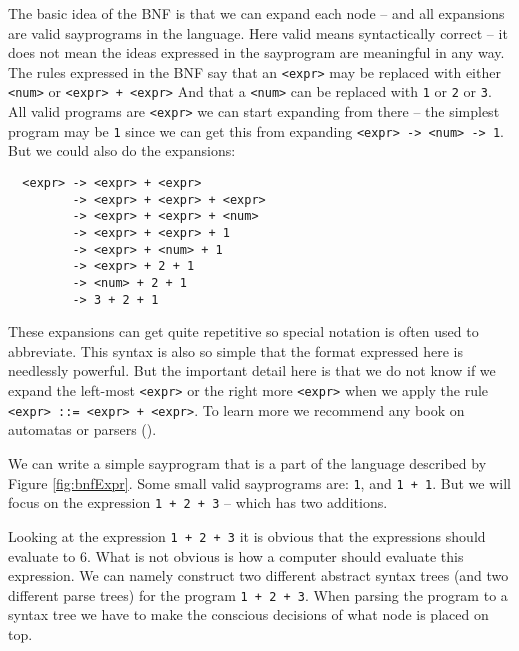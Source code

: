 The basic idea of the BNF is that we can expand each node -- and all expansions are valid say{programs} in the language. Here valid means syntactically correct -- it does not mean the ideas expressed in the say{program} are meaningful in any way. The rules expressed in the BNF say that an \verb|<expr>| may be replaced with either \verb|<num>| or \verb|<expr> + <expr>| And that a \verb|<num>| can be replaced with \verb|1| or \verb|2| or \verb|3|. All valid programs are \verb|<expr>| we can start expanding from there -- the simplest program may be \verb|1| since we can get this from expanding \verb|<expr> -> <num> -> 1|. But we could also do the expansions:
\begin{verbatim}
  <expr> -> <expr> + <expr>
         -> <expr> + <expr> + <expr>
         -> <expr> + <expr> + <num>
         -> <expr> + <expr> + 1
         -> <expr> + <num> + 1
         -> <expr> + 2 + 1
         -> <num> + 2 + 1
         -> 3 + 2 + 1
\end{verbatim}
These expansions can get quite repetitive so special notation is often used to abbreviate. This syntax is also so simple that the format expressed here is needlessly powerful. But the important detail here is that we do not know if we expand the left-most \verb|<expr>| or the right more \verb|<expr>| when we apply the rule \verb|<expr> ::= <expr> + <expr>|. To learn more we recommend any book on automatas or parsers (\cite{src:DragonBook}). 

We can write a simple say{program} that is a part of the language described by Figure \ref{fig:bnfExpr}. Some small valid say{programs} are: \verb!1!, and \verb!1 + 1!. But we will focus on the expression \verb!1 + 2 + 3! -- which has two additions.

Looking at the expression \verb!1 + 2 + 3! it is obvious that the expressions should evaluate to 6. What is not obvious is how a computer should evaluate this expression. We can namely construct two different abstract syntax trees (and two different parse trees) for the program \verb!1 + 2 + 3!. When parsing the program to a syntax tree we have to make the conscious decisions of what node is placed on top.


